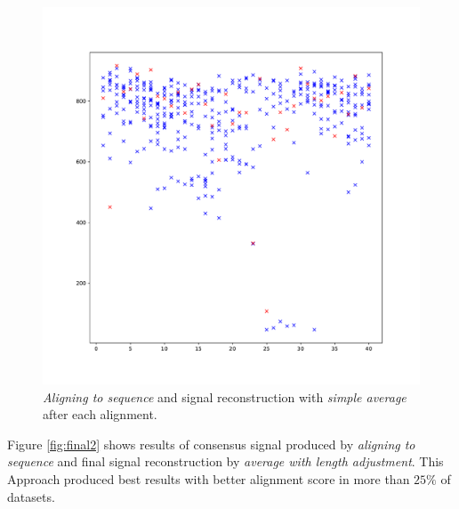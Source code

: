 \begin{figure}[h]
  \centering
  \includegraphics[width=1.0\textwidth]{images/final3}
  \caption{\textit{Aligning to sequence} and signal reconstruction with \textit{simple average} after each alignment.}
  \label{fig:final3}
\end{figure}

Figure \ref{fig:final2} shows results of consensus signal produced by \textit{aligning to sequence} and
final signal reconstruction by \textit{average with length adjustment}. This Approach produced best results with better alignment
score in more than $25\%$ of datasets.

